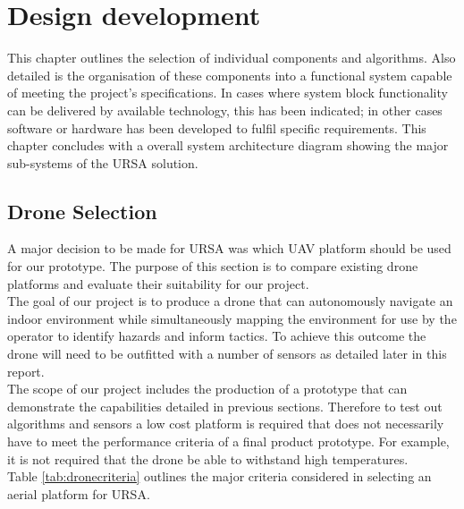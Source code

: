 \documentclass[capstone_report.tex]{subfiles}
\begin{document}
\chapter{Design development}
This chapter outlines the selection of individual components and algorithms. Also detailed is the organisation of these components into a functional system capable of meeting the project's specifications. In cases where system block functionality can be delivered by available technology, this has been indicated; in other cases software or hardware has been developed to fulfil specific requirements. This chapter concludes with a overall system architecture diagram showing the major sub-systems of the URSA solution.

\section{Drone Selection}
A major decision to be made for URSA was which UAV platform should be used for our prototype. The purpose of this section is to compare existing drone platforms and evaluate their suitability for our project.\\

The goal of our project is to produce a drone that can autonomously navigate an indoor environment while simultaneously mapping the environment for use by the operator to identify hazards and inform tactics.  To achieve this outcome the drone will need to be outfitted with a number of sensors as detailed later in this report.\\

The scope of our project includes the production of a prototype that can demonstrate the capabilities detailed in previous sections.  Therefore to test out algorithms and sensors a low cost platform is required that does not necessarily have to meet the performance criteria of a final product prototype. For example, it is not required that the drone be able to withstand high temperatures.\\

Table \ref{tab:dronecriteria} outlines the major criteria considered in selecting an aerial platform for URSA. 
\end{document}
